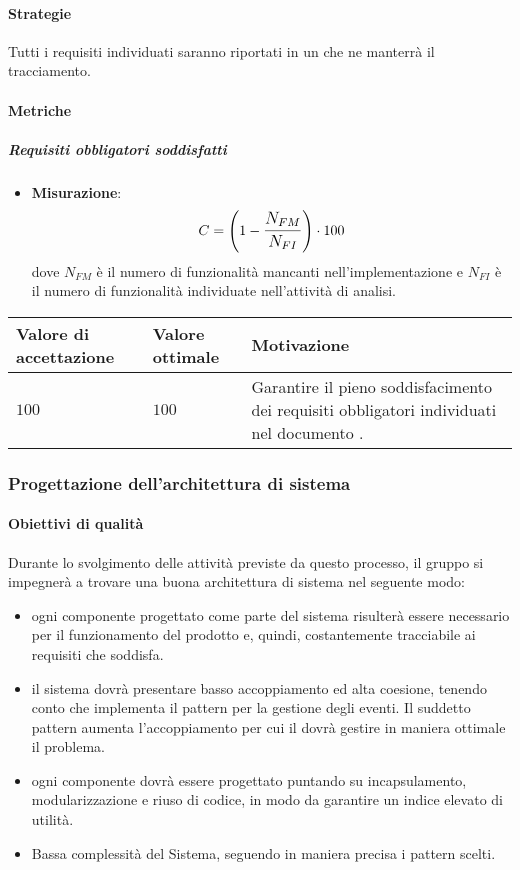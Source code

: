 \paragraph{Strategie}
Tutti i requisiti individuati saranno riportati in un  che ne manterrà il tracciamento.

\paragraph{Metriche}
\subparagraph{Requisiti obbligatori soddisfatti}

\begin{itemize}
\item \textbf{Misurazione}: 
		$$C=\left(1-\mathlarger{\frac{N_{FM}}{N_{FI}}}\right) \cdot 100$$ 
	dove $N_{FM}$ è il numero di funzionalità mancanti nell'implementazione e $N_{FI}$ è il numero di funzionalità individuate nell'attività di analisi. 
\end{itemize}
	
\begin{center}
	\begin{tabular}{|P{2.5cm}|P{2.5cm}|P{6cm}|}
		\hline
			\textbf{Valore di accettazione}	& \textbf{Valore ottimale} & \textbf{Motivazione} \\
			\hline
			$100$ & $100$ & Garantire il pieno soddisfacimento dei requisiti obbligatori individuati nel documento \AdR. \\
			\hline
			\end{tabular}
\end{center}	

\subsubsection{Progettazione dell'architettura di sistema}

\paragraph{Obiettivi di qualità}
Durante lo svolgimento delle attività previste da questo processo, il gruppo si impegnerà a trovare una buona architettura di sistema nel seguente modo:
\begin{itemize}
\item ogni componente progettato come parte del sistema risulterà essere necessario per il funzionamento del prodotto e, quindi, costantemente tracciabile ai requisiti che soddisfa.
\item il sistema dovrà presentare basso accoppiamento ed alta coesione, tenendo conto che  implementa il pattern  per la gestione degli eventi. Il suddetto pattern aumenta l'accoppiamento per cui il  dovrà gestire in maniera ottimale il problema.
\item ogni componente dovrà essere progettato puntando su incapsulamento, modularizzazione e riuso di codice, in modo da garantire un indice elevato di utilità.
\item Bassa complessità del Sistema, seguendo in maniera precisa i pattern scelti.
\end{itemize}
\newpage

